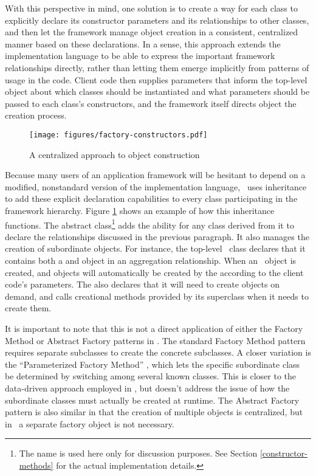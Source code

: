 With this perspective in mind, one solution is to create a way for
each class to explicitly declare its constructor parameters and its
relationships to other classes, and then let the framework manage
object creation in a consistent, centralized manner based on these
declarations.  In a sense, this approach extends the implementation
language to be able to express the important framework relationships
directly, rather than letting them emerge implicitly from patterns of
usage in the code.  Client code then supplies parameters that inform
the top-level object about which classes should be instantiated and
what parameters should be passed to each class's constructors, and the
framework itself directs object the creation process.

\begin{figure}
\texttt{[image: figures/factory-constructors.pdf]}
\caption{A centralized approach to object construction}
\label{factory-constructors}
\end{figure}

Because many users of an application framework will be hesitant to
depend on a modified, nonstandard version of the implementation
language, \aicat\ uses inheritance to add these explicit declaration
capabilities to every class participating in the framework hierarchy.
Figure \ref{factory-constructors} shows an example of how this
inheritance functions.  The abstract 
class\footnote{The  name is used here only for
discussion purposes.  See Section \ref{constructor-methods} for the actual
implementation details.} adds the ability for any class derived from
it to declare the relationships discussed in the previous paragraph.
It also manages the creation of subordinate objects.  For instance,
the top-level \aicat\ class declares that it contains both a
 and  object in an aggregation
relationship.  When an \aicat\ object is created, 
and  objects will automatically be created by the
 according to the client code's parameters.  The
 also declares that it will need to create
 objects on demand, and calls creational methods
provided by its  superclass when it needs to
create them.

It is important to note that this is not a direct application of
either the Factory Method or Abstract Factory patterns in
\cite{gamma:95}.  The standard Factory Method pattern requires
separate subclasses to create the concrete subclasses.  A closer
variation is the ``Parameterized Factory Method''
\cite[p. 110]{gamma:95}, which lets the specific subordinate class
be determined by switching among several known classes.  This is
closer to the data-driven approach employed in \aicat, but doesn't
address the issue of how the subordinate classes must actually be
created at runtime.  The Abstract Factory pattern is also similar in
that the creation of multiple objects is centralized, but in \aicat\ a
separate factory object is not necessary.

